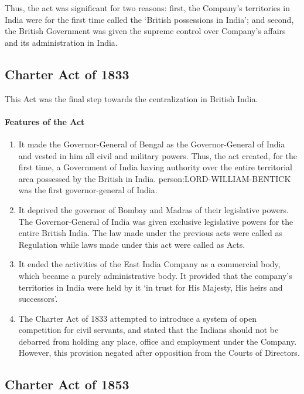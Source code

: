 Thus, the act was significant for two reasons: first, the Company's territories in India were for the first time called the `British possessions in India'; and second, the British Government was given the supreme control over Company's affairs and its administration in India.

\subsection{Charter Act of 1833}

This Act was the final step towards the centralization in British India.

\paragraph{Features of the Act}
\begin{enumerate}
  \item It made the Governor-General of Bengal as the Governor-General of India and vested in him all civil and military powers. Thus, the act created, for the first time, a Government of India having authority over the entire territorial area possessed by the British in India. \gls{person:LORD-WILLIAM-BENTICK} was the first governor-general of India.
  \item It deprived the governor of Bombay and Madras of their legislative powers. The Governor-General of India was given exclusive legislative powers for the entire British India. The law made under the previous acts were called as Regulation while laws made under this act were called as Acts.
  \item It ended the activities of the East India Company as a commercial body, which became a purely administrative body. It provided that the company's territories in India were held by it `in trust for His Majesty, His heirs and successors'.
  \item The Charter Act of 1833 attempted to introduce a system of open competition for civil servants, and stated that the Indians should not be debarred from holding any place, office and employment under the Company. However, this provision negated after opposition from the Courts of Directors.
\end{enumerate}

\subsection{Charter Act of 1853}


